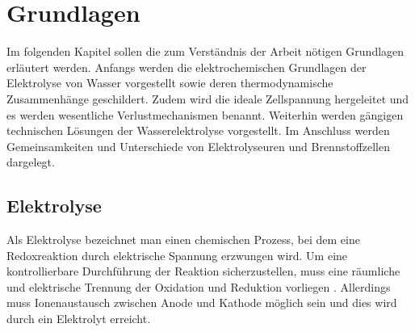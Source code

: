 \chapter{Grundlagen}
\label{cha:Grundlagen}
Im folgenden Kapitel sollen die zum Verständnis der Arbeit nötigen Grundlagen erläutert werden. Anfangs werden die elektrochemischen Grundlagen der Elektrolyse von Wasser vorgestellt sowie deren thermodynamische Zusammenhänge geschildert. Zudem wird die ideale Zellspannung hergeleitet und es werden wesentliche Verlustmechanismen benannt. Weiterhin werden gängigen technischen Lösungen der Wasserelektrolyse vorgestellt. Im Anschluss werden Gemeinsamkeiten und Unterschiede von Elektrolyseuren und Brennstoffzellen dargelegt. \\


\section{Elektrolyse}
\label{sec:Elektrolyse}
Als Elektrolyse bezeichnet man einen chemischen Prozess, bei dem eine Redoxreaktion durch elektrische Spannung erzwungen wird. 
Um eine kontrollierbare Durchführung der Reaktion sicherzustellen, muss eine räumliche und elektrische Trennung der Oxidation und Reduktion vorliegen \cite{ISBN 978-3-95806-217-7}. Allerdings muss Ionenaustausch zwischen Anode und Kathode möglich sein und dies wird durch ein Elektrolyt erreicht.

